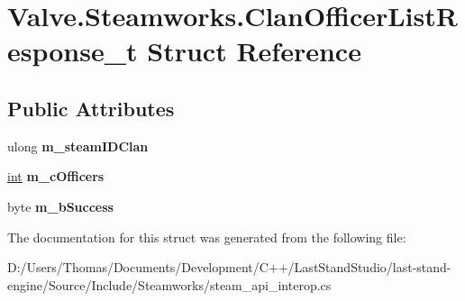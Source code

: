 \hypertarget{structValve_1_1Steamworks_1_1ClanOfficerListResponse__t}{}\section{Valve.\+Steamworks.\+Clan\+Officer\+List\+Response\+\_\+t Struct Reference}
\label{structValve_1_1Steamworks_1_1ClanOfficerListResponse__t}
\subsection*{Public Attributes}
\begin{DoxyCompactItemize}
\item 
\hypertarget{structValve_1_1Steamworks_1_1ClanOfficerListResponse__t_a685ebfc460ca85b69e0acd231b4d9062}{}ulong {\bfseries m\+\_\+steam\+I\+D\+Clan}\label{structValve_1_1Steamworks_1_1ClanOfficerListResponse__t_a685ebfc460ca85b69e0acd231b4d9062}

\item 
\hypertarget{structValve_1_1Steamworks_1_1ClanOfficerListResponse__t_a2a7f090ae0fcfc4fa9bba135976dee3e}{}\hyperlink{SDL__thread_8h_a6a64f9be4433e4de6e2f2f548cf3c08e}{int} {\bfseries m\+\_\+c\+Officers}\label{structValve_1_1Steamworks_1_1ClanOfficerListResponse__t_a2a7f090ae0fcfc4fa9bba135976dee3e}

\item 
\hypertarget{structValve_1_1Steamworks_1_1ClanOfficerListResponse__t_a443eefd62c3e6b1fe1e94caf4fc3ee89}{}byte {\bfseries m\+\_\+b\+Success}\label{structValve_1_1Steamworks_1_1ClanOfficerListResponse__t_a443eefd62c3e6b1fe1e94caf4fc3ee89}

\end{DoxyCompactItemize}


The documentation for this struct was generated from the following file\+:\begin{DoxyCompactItemize}
\item 
D\+:/\+Users/\+Thomas/\+Documents/\+Development/\+C++/\+Last\+Stand\+Studio/last-\/stand-\/engine/\+Source/\+Include/\+Steamworks/steam\+\_\+api\+\_\+interop.\+cs\end{DoxyCompactItemize}

